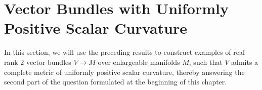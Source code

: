 \section{Vector Bundles with Uniformly Positive Scalar Curvature}

In this section, we will use the preceding results to construct examples of real rank $2$ vector bundles $V \to M$ over enlargeable manifolds $M$, such that $V$ admits a complete metric of uniformly positive scalar curvature, thereby answering the second part of the question formulated at the beginning of this chapter.

